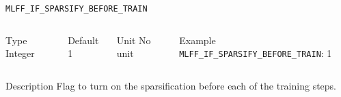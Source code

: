 \begin{frame}[allowframebreaks]{\texttt{{MLFF\_IF\_SPARSIFY\_BEFORE\_TRAIN}}} \label{MLFF_IF_SPARSIFY_BEFORE_TRAIN}
\vspace*{-12pt}
\begin{columns}
\begin{block}{Type}
Integer
\end{block}

\begin{block}{Default}
1
\end{block}

\begin{block}{Unit}
No unit
\end{block}

\begin{block}{Example}
\texttt{MLFF\_IF\_SPARSIFY\_BEFORE\_TRAIN}: 1
\end{block}
\end{columns}

\begin{block}{Description}
 Flag to turn on the sparsification before each of the training steps.
\end{block}

%
\end{frame}

